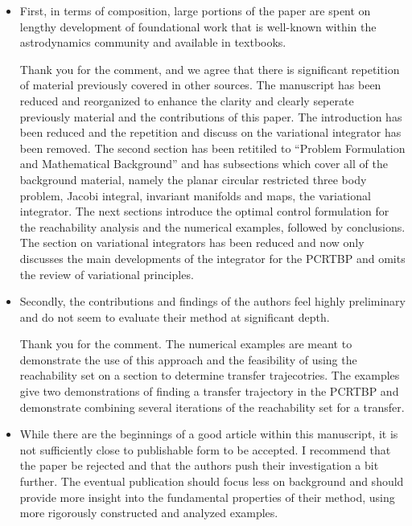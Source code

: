 \documentclass[11pt]{article}
\begin{document}
\begin{itemize}

\item 
    \begin{itshape}
First, in terms of composition, large portions of the paper are spent on lengthy development of foundational work that is well-known within the astrodynamics community and available in textbooks. 
\end{itshape}

    Thank you for the comment, and we agree that there is significant repetition of material previously covered in other sources.
    The manuscript has been reduced and reorganized to enhance the clarity and clearly seperate previously material and the contributions of this paper.
    The introduction has been reduced and the repetition and discuss on the variational integrator has been removed.
    The second section has been retitiled to ``Problem Formulation and Mathematical Background'' and has subsections which cover all of the background material, namely the planar circular restricted three body problem, Jacobi integral, invariant manifolds and \Poincare maps, the variational integrator.
The next sections introduce the optimal control formulation for the reachability analysis and the numerical examples, followed by conclusions.
The section on variational integrators has been reduced and now only discusses the main developments of the integrator for the PCRTBP and omits the review of variational principles.

\item 
    \begin{itshape}
        Secondly, the contributions and findings of the authors feel highly preliminary and do not seem to evaluate their method at significant depth.
    \end{itshape}

    Thank you for the comment. 
    The numerical examples are meant to demonstrate the use of this approach and the feasibility of using the reachability set on a \Poincare section to determine transfer trajecotries.
    The examples give two demonstrations of finding a transfer trajectory in the PCRTBP and demonstrate combining several iterations of the reachability set for a transfer.

\item
    \begin{itshape}
While there are the beginnings of a good article within this manuscript, it is not sufficiently close to publishable form to be accepted.  I recommend that the paper be rejected and that the authors push their investigation a bit further.  The eventual publication should focus less on background and should provide more insight into the fundamental properties of their method, using more rigorously constructed and analyzed examples.
\end{itshape}


\end{itemize}
\end{document}
